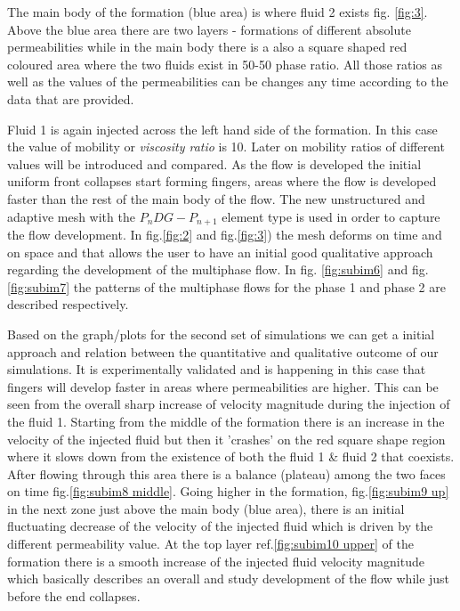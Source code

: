 \documentclass[preprint,authoryear,12pt]{elsarticle}
\begin{document}
The main body of the formation (blue area) is where fluid 2 exists fig. \ref{fig:3}. Above the blue area there are two layers - formations of different absolute permeabilities while in the main body there is a also a square shaped red coloured area where the two fluids exist in 50-50 phase ratio. All those ratios as well as the values of the permeabilities can be changes any time according to the data that are provided.

Fluid 1 is again injected across the left hand side of the formation. In this case the value of mobility or \textit{viscosity ratio} is 10. Later on mobility ratios of different values will be introduced and compared. As the flow is developed the initial uniform front collapses start forming fingers, areas where the flow is developed faster than the rest of the main body of the flow. The new unstructured and adaptive mesh with the $P_{n}DG-P_{n+1}$ element type is used in order to capture the flow development. In fig.\ref{fig:2} and fig.\ref{fig:3}) the mesh deforms on time and on space and that allows the user to have an initial good qualitative approach regarding the development of the multiphase flow. In fig. \ref{fig:subim6} and fig. \ref{fig:subim7} the patterns of the multiphase flows for the phase 1 and phase 2 are described respectively.

Based on the graph/plots for the second set of simulations we can get a initial approach and relation between the quantitative and qualitative outcome of our simulations. It is experimentally validated and is happening in this case that fingers will develop faster in areas where permeabilities are higher. This can be seen from the overall sharp increase of velocity magnitude during the injection of the fluid 1. Starting from the middle of the formation there is an increase in the velocity of the injected fluid but then it 'crashes' on the red square shape region where it slows down from the existence of both the fluid 1 \& fluid 2 that coexists. After flowing through this area there is a balance (plateau) among the two faces on time fig.\ref{fig:subim8 middle}. Going higher in the formation, fig.\ref{fig:subim9 up} in the next zone just above the main body (blue area), there is an initial fluctuating decrease  of the velocity of the injected fluid which is driven by the different permeability value. At the top layer ref.\ref{fig:subim10 upper} of the formation there is a smooth increase of the injected fluid velocity magnitude which basically describes an overall and study development of the flow while just before the end collapses. 
\end{document}
